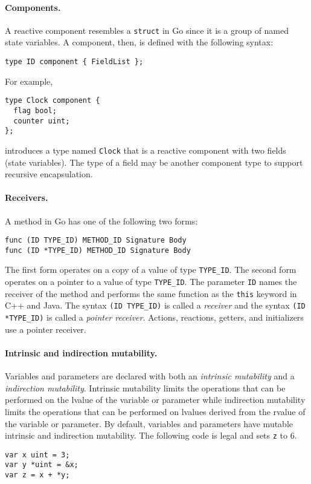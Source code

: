 \paragraph{Components.}
A reactive component resembles a \verb+struct+ in Go since it is a group of named state variables.
A component, then, is defined with the following syntax:
\begin{verbatim}
type ID component { FieldList };
\end{verbatim}
For example,
\begin{verbatim}
type Clock component {
  flag bool;
  counter uint;
};
\end{verbatim}
introduces a type named \verb+Clock+ that is a reactive component with two fields (state variables).
The type of a field may be another component type to support recursive encapsulation.

\paragraph{Receivers.}
A method in Go has one of the following two forms:
\begin{verbatim}
func (ID TYPE_ID) METHOD_ID Signature Body
func (ID *TYPE_ID) METHOD_ID Signature Body
\end{verbatim}
The first form operates on a copy of a value of type \verb+TYPE_ID+.
The second form operates on a pointer to a value of type \verb+TYPE_ID+.
The parameter \verb+ID+ names the receiver of the method and performs the same function as the \verb+this+ keyword in C++ and Java.
The syntax \verb+(ID TYPE_ID)+ is called a \emph{receiver} and the syntax \verb+(ID *TYPE_ID)+ is called a \emph{pointer receiver}.
Actions, reactions, getters, and initializers use a pointer receiver.

\paragraph{Intrinsic and indirection mutability.}
Variables and parameters are declared with both an \emph{intrinsic mutability} and a \emph{indirection mutability}.
Intrinsic mutability limits the operations that can be performed on the lvalue of the variable or parameter while indirection mutability limits the operations that can be performed on lvalues derived from the rvalue of the variable or parameter.
By default, variables and parameters have mutable intrinsic and indirection mutability.
The following code is legal and sets \verb+z+ to 6.
\begin{verbatim}
var x uint = 3;
var y *uint = &x;
var z = x + *y;
\end{verbatim}

